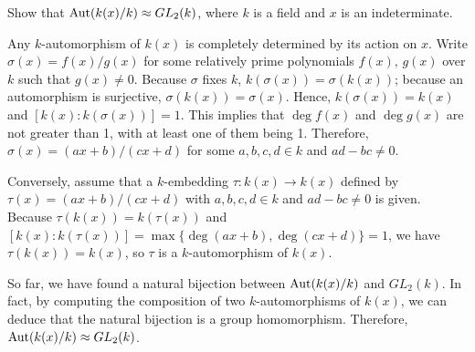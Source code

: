 \begin{prob}
    Show that ${\textrm{Aut}({k(x)/k})}\approx GL_2(k)$, where $k$ is a field and $x$ is an indeterminate.
\end{prob}
\begin{sol}
    Any $k$-automorphism of $k(x)$ is completely determined by its action on $x$.
    Write $\sigma(x)=f(x)/g(x)$ for some relatively prime polynomials $f(x),\,g(x)$ over $k$ such that $g(x)\neq 0$.
    Because $\sigma$ fixes $k$, $k(\sigma(x))=\sigma(k(x))$; because an automorphism is surjective, $\sigma(k(x))=\sigma(x)$.
    Hence, $k(\sigma(x))=k(x)$ and $[k(x): k(\sigma(x))]=1$.
    This implies that $\deg f(x)$ and $\deg g(x)$ are not greater than 1, with at least one of them being 1.
    Therefore, $\sigma(x)=(ax+b)/(cx+d)$ for some $a, b, c, d\in k$ and $ad-bc\neq 0$.
    
    Conversely, assume that a $k$-embedding $\tau: k(x)\rightarrow k(x)$ defined by $\tau(x)=(ax+b)/(cx+d)$ with $a, b, c, d\in k$ and $ad-bc\neq 0$ is given.
    Because $\tau(k(x))=k(\tau(x))$ and $[k(x): k(\tau(x))]=\max\{\deg(ax+b), \deg(cx+d)\}=1$, we have $\tau(k(x))=k(x)$, so $\tau$ is a $k$-automorphism of $k(x)$.

    So far, we have found a natural bijection between ${\textrm{Aut}({k(x)/k})}$ and $GL_2(k)$.
    In fact, by computing the composition of two $k$-automorphisms of $k(x)$, we can deduce that the natural bijection is a group homomorphism.
    Therefore, ${\textrm{Aut}({k(x)/k})}\approx GL_2(k)$.
\end{sol}
